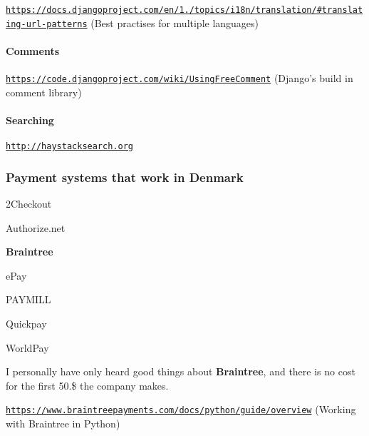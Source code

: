 \begin{DoxyEnumerate}
\item \href{https://docs.djangoproject.com/en/1.6/topics/i18n/translation/#translating-url-patterns}{\tt https\-://docs.\-djangoproject.\-com/en/1./topics/i18n/translation/\#translating-\/url-\/patterns} (Best practises for multiple languages)
\end{DoxyEnumerate}

\paragraph*{Comments}


\begin{DoxyEnumerate}
\item \href{https://code.djangoproject.com/wiki/UsingFreeComment}{\tt https\-://code.\-djangoproject.\-com/wiki/\-Using\-Free\-Comment} (Django's build in comment library)
\end{DoxyEnumerate}

\paragraph*{Searching}


\begin{DoxyEnumerate}
\item \href{http://haystacksearch.org}{\tt http\-://haystacksearch.\-org}
\end{DoxyEnumerate}

\subsubsection*{Payment systems that work in Denmark}


\begin{DoxyEnumerate}
\item 2\-Checkout
\item Authorize.\-net
\item {\bfseries Braintree}
\item e\-Pay
\item P\-A\-Y\-M\-I\-L\-L
\item Quickpay
\item World\-Pay
\end{DoxyEnumerate}

I personally have only heard good things about {\bfseries Braintree}, and there is no cost for the first 50.\$ the company makes.

\href{https://www.braintreepayments.com/docs/python/guide/overview}{\tt https\-://www.\-braintreepayments.\-com/docs/python/guide/overview} (Working with Braintree in Python)

